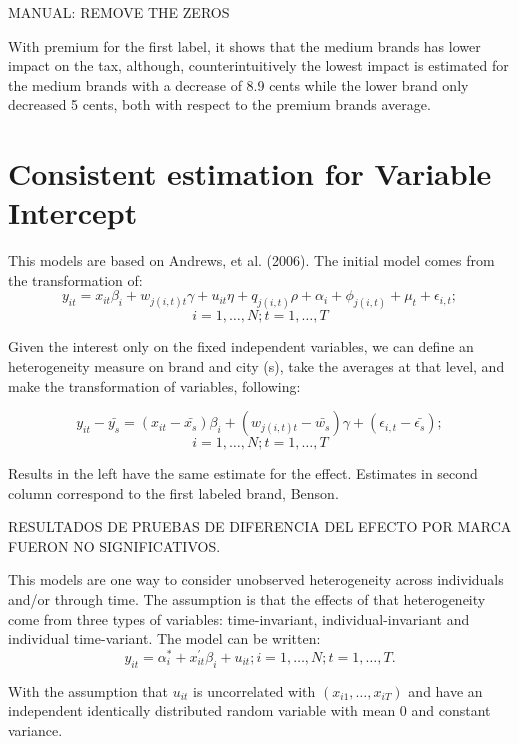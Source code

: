 \documentclass[]{article}
\begin{document}


MANUAL: REMOVE THE ZEROS 

With premium for the first label, it shows that the medium brands has lower impact on the tax, although, counterintuitively the lowest impact is estimated for the medium brands with a decrease of 8.9 cents while the lower brand only decreased 5 cents, both with respect to the premium brands average. 

 
\section{Consistent estimation for Variable Intercept}
This models are based on Andrews, et al. (2006). The initial model comes from the transformation of:
\begin{equation*}
	y_{it} = x_{it} \beta_{i} + w_{j(i,t)t} \gamma + u_{it} \eta + q_{j(i,t)} \rho + \alpha_{i}  + \phi_{j(i,t)} + \mu_{t} + \epsilon_{i,t}; 
\end{equation*}
$$i = 1,\ldots,N; t=1,\ldots,T$$

Given the interest only on the fixed independent variables, we can define an heterogeneity measure on brand and city (s), take the averages at that level, and make the transformation of variables, following:
 
\begin{equation*}
y_{it} - \bar{y_s} = (x_{it} - \bar{x_{s}}) \beta_{i} + (w_{j(i,t)t}-\bar{w_{s}}) \gamma + (\epsilon_{i,t} - \bar{\epsilon_{s}}); 
\end{equation*}
$$i = 1,\ldots,N; t=1,\ldots,T$$
 
Results in the left have the same estimate for the effect. Estimates in second column correspond to the first labeled brand, Benson.
 


RESULTADOS DE PRUEBAS DE DIFERENCIA DEL EFECTO POR MARCA FUERON NO SIGNIFICATIVOS.


This models are one way to consider unobserved heterogeneity across individuals and/or through time. The assumption is that the effects of that heterogeneity come from three types of variables: time-invariant, individual-invariant and individual time-variant.
The model can be written:
\begin{equation*}
y_{it} = \alpha_{i}^{*} + x_{it}^{'} \beta_{i} + u_{it}; i = 1,\ldots,N; t=1,\ldots,T.
\end{equation*}

With the assumption that $u_{it}$ is uncorrelated with $(x_{i1},\ldots,x_{iT})$
and have an independent identically distributed random variable with mean 0 and constant variance.
\end{document}
